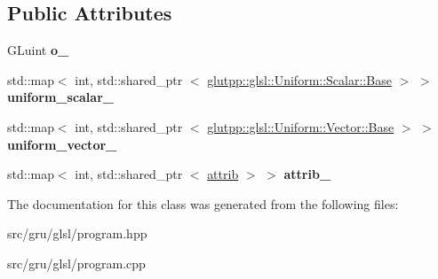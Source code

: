\subsection*{\-Public \-Attributes}
\begin{DoxyCompactItemize}
\item 
\hypertarget{classglutpp_1_1glsl_1_1program_ac72cb1de967afd0617edf350dfa80dfd}{\-G\-Luint {\bfseries o\-\_\-}}\label{classglutpp_1_1glsl_1_1program_ac72cb1de967afd0617edf350dfa80dfd}

\item 
\hypertarget{classglutpp_1_1glsl_1_1program_a48aafa780d255592084de7806a65a196}{std\-::map$<$ int, std\-::shared\-\_\-ptr\*
$<$ \hyperlink{classglutpp_1_1glsl_1_1Uniform_1_1Scalar_1_1Base}{glutpp\-::glsl\-::\-Uniform\-::\-Scalar\-::\-Base} $>$ $>$ {\bfseries uniform\-\_\-scalar\-\_\-}}\label{classglutpp_1_1glsl_1_1program_a48aafa780d255592084de7806a65a196}

\item 
\hypertarget{classglutpp_1_1glsl_1_1program_a83a3f69a97e62342e3e81fe7548e9ffd}{std\-::map$<$ int, std\-::shared\-\_\-ptr\*
$<$ \hyperlink{classglutpp_1_1glsl_1_1Uniform_1_1Vector_1_1Base}{glutpp\-::glsl\-::\-Uniform\-::\-Vector\-::\-Base} $>$ $>$ {\bfseries uniform\-\_\-vector\-\_\-}}\label{classglutpp_1_1glsl_1_1program_a83a3f69a97e62342e3e81fe7548e9ffd}

\item 
\hypertarget{classglutpp_1_1glsl_1_1program_af8419390e2c2ba623c2a711568a7bdab}{std\-::map$<$ int, std\-::shared\-\_\-ptr\*
$<$ \hyperlink{classglutpp_1_1glsl_1_1attrib}{attrib} $>$ $>$ {\bfseries attrib\-\_\-}}\label{classglutpp_1_1glsl_1_1program_af8419390e2c2ba623c2a711568a7bdab}

\end{DoxyCompactItemize}


\-The documentation for this class was generated from the following files\-:\begin{DoxyCompactItemize}
\item 
src/gru/glsl/program.\-hpp\item 
src/gru/glsl/program.\-cpp\end{DoxyCompactItemize}
